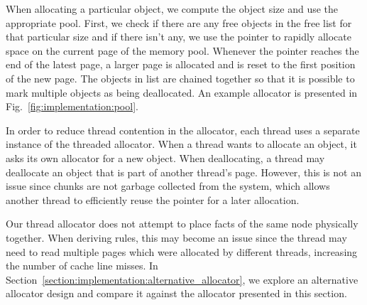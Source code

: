 When allocating a particular object, we compute the object size and use the
appropriate pool. First, we check if there are any free objects in the free list
for that particular size and if there isn't any, we use the  pointer
to rapidly allocate space on the current page of the memory pool.  Whenever the
 pointer reaches the end of the latest page, a larger page is
allocated and  is reset to the first position of the new page. The
objects in  list are chained together so that it is possible to mark
multiple objects as being deallocated.  An example allocator is presented in
Fig.~\ref{fig:implementation:pool}.


In order to reduce thread contention in the allocator, each thread uses a
separate instance of the threaded allocator. When a thread wants to allocate an
object, it asks its own allocator for a new object. When deallocating, a thread
may deallocate an object that is part of another thread's page. However, this is
not an issue since chunks are not garbage collected from the system, which
allows another thread to efficiently reuse the pointer for a later allocation.

Our thread allocator does not attempt to place facts of the same node physically
together. When deriving rules, this may become an issue since the thread may
need to read multiple pages which were allocated by different threads,
increasing the number of cache line misses. In
Section~\ref{section:implementation:alternative_allocator}, we explore an
alternative allocator design and compare it against the allocator presented in
this section.
